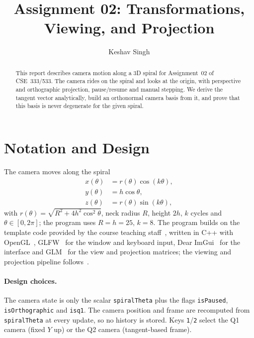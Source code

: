 \documentclass[acmlarge]{acmart}
\begin{document}
\title{Assignment 02: Transformations, Viewing, and Projection}

\author{Keshav Singh}

\begin{abstract}
This report describes camera motion along a 3D spiral for Assignment~02 of
CSE~333/533. The camera rides on the spiral and looks at the origin, with
perspective and orthographic projection, pause/resume and manual stepping. We
derive the tangent vector analytically, build an orthonormal camera basis from
it, and prove that this basis is never degenerate for the given spiral.
\end{abstract}


\maketitle
\newpage

\section{Notation and Design}

The camera moves along the spiral
\begin{align}
  x(\theta) &= r(\theta)\cos(k\theta), \label{eq:x}\\
  y(\theta) &= h\cos\theta, \label{eq:y}\\
  z(\theta) &= r(\theta)\sin(k\theta), \label{eq:z}
\end{align}
with $r(\theta)=\sqrt{R^2+4h^2\cos^2\theta}$, neck radius $R$, height $2h$,
$k$ cycles and $\theta\in[0,2\pi]$; the program uses $R=h=25$, $k=8$. The program builds on the template code provided by the course teaching staff~\cite{template}, written in C++ with OpenGL~\cite{khronos}, GLFW~\cite{glfw} for the window and keyboard input, Dear ImGui~\cite{imgui} for the interface and GLM~\cite{glm} for the view and projection matrices; the viewing and projection pipeline follows~\cite{learnopengl}.

\paragraph{Design choices.} The camera state is only the scalar
\texttt{spiralTheta} plus the flags \texttt{isPaused}, \texttt{isOrthographic}
and \texttt{isq1}. The camera position and frame are recomputed from
\texttt{spiralTheta} at every update, so no history is stored. Keys
\texttt{1}/\texttt{2} select the Q1 camera (fixed $Y$ up) or the Q2 camera
(tangent-based frame).
\end{document}
